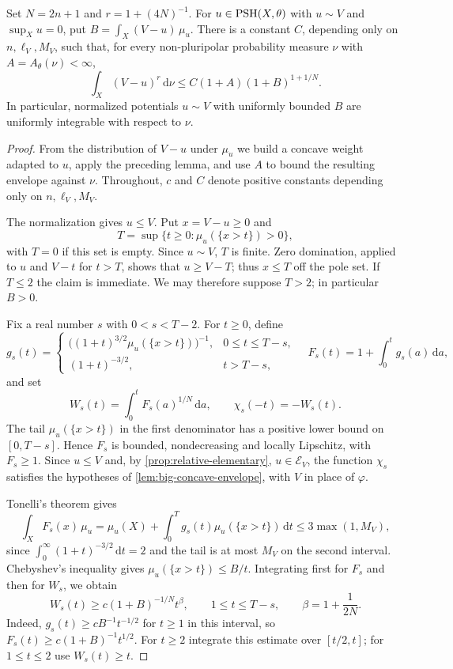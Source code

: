 \begin{proposition}\label{prop:big-minimal-higher-moment}
Set $N=2n+1$ and $r=1+(4N)^{-1}$. For $u\in\mathrm{PSH}(X,\theta)$ with $u\sim V$ and $\sup_Xu=0$, put $B=\int_X(V-u)\,\mu_u$. There is a constant $C$, depending only on $n,\ell_V,M_V$, such that, for every non-pluripolar probability measure $\nu$ with $A=A_\theta(\nu)<\infty$,
\[
 \int_X(V-u)^r\,\mathrm{d}\nu
 \leq C(1+A)(1+B)^{1+1/N}
 .
\]
In particular, normalized potentials $u\sim V$ with uniformly bounded $B$ are uniformly integrable with respect to $\nu$.
\end{proposition}
\begin{proof}
From the distribution of $V-u$ under $\mu_u$ we build a concave weight adapted to $u$, apply the preceding lemma, and use $A$ to bound the resulting envelope against $\nu$. Throughout, $c$ and $C$ denote positive constants depending only on $n,\ell_V,M_V$.

The normalization gives $u\leq V$. Put $x=V-u\geq0$ and
\[
 T=\sup\{t\geq0:\mu_u(\{x>t\})>0\},
\]
with $T=0$ if this set is empty. Since $u\sim V$, $T$ is finite. Zero domination, applied to $u$ and $V-t$ for $t>T$, shows that $u\geq V-T$; thus $x\leq T$ off the pole set. If $T\leq2$ the claim is immediate. We may therefore suppose $T>2$; in particular $B>0$.

Fix a real number $s$ with $0<s<T-2$. For $t\geq0$, define
\[
 g_s(t)=
 \begin{cases}
  \bigl((1+t)^{3/2}\mu_u(\{x>t\})\bigr)^{-1},&0\leq t\leq T-s,\\
  (1+t)^{-3/2},&t>T-s,
 \end{cases}
 \quad F_s(t)=1+\int_0^t g_s(a)\,\mathrm{d}a,
\]
and set
\[
 W_s(t)=\int_0^t F_s(a)^{1/N}\,\mathrm{d}a,
 \qquad\chi_s(-t)=-W_s(t).
\]
The tail $\mu_u(\{x>t\})$ in the first denominator has a positive lower bound on $[0,T-s]$. Hence $F_s$ is bounded, nondecreasing and locally Lipschitz, with $F_s\geq1$. Since $u\leq V$ and, by \cref{prop:relative-elementary}, $u\in\mathcal E_V$, the function $\chi_s$ satisfies the hypotheses of \cref{lem:big-concave-envelope}, with $V$ in place of $\varphi$.

Tonelli's theorem gives
\begin{equation}\label{eq:big-weight-derivative-moment}
 \int_X F_s(x)\,\mu_u
 =\mu_u(X)+\int_0^Tg_s(t)\mu_u(\{x>t\})\,\mathrm{d}t
 \leq3\max(1,M_V),
\end{equation}
since $\int_0^\infty(1+t)^{-3/2}\,\mathrm{d}t=2$ and the tail is at most $M_V$ on the second interval.
Chebyshev's inequality gives $\mu_u(\{x>t\})\leq B/t$. Integrating first for $F_s$ and then for $W_s$, we obtain
\begin{equation}\label{eq:big-weight-growth}
 W_s(t)\geq c(1+B)^{-1/N}t^{\beta},
 \qquad1\leq t\leq T-s,
 \qquad\beta=1+\frac1{2N}.
\end{equation}
Indeed, $g_s(t)\geq cB^{-1}t^{-1/2}$ for $t\geq1$ in this interval, so $F_s(t)\geq c(1+B)^{-1}t^{1/2}$. For $t\geq2$ integrate this estimate over $[t/2,t]$; for $1\leq t\leq2$ use $W_s(t)\geq t$.


\end{proof}

